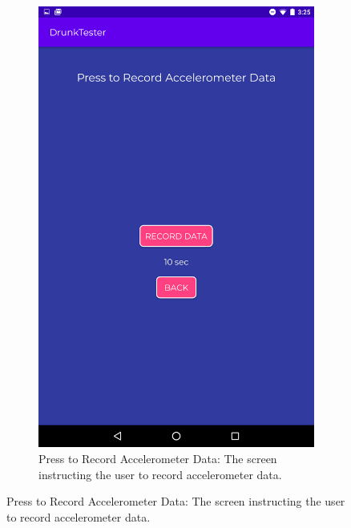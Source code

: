 \documentclass[12pt,a4paper]{article}
\begin{document}
\begin{figure}[htb!]
\begin{subfigure}[b]{0.35\textwidth}
        \includegraphics[width=\textwidth]{materials/Press_to_record_accelerometer_data.png}
        \caption*{Press to Record Accelerometer Data: The screen instructing the user to record accelerometer data.}
    \end{subfigure}
\end{figure}
\end{document}
